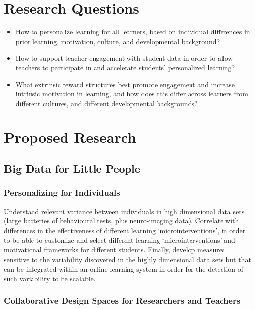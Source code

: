 \documentclass[12pt,a4paper,titlepage]{scrreprt}
\begin{document}
\chapter{Research Questions}
\begin{itemize}
\item How to personalize learning for all learners, based on individual differences in prior learning, motivation, culture, and developmental background?
\item How to support teacher engagement with student data in order to allow teachers to participate in and accelerate students' personalized learning?
\item What extrinsic reward structures best promote engagement and increase intrinsic motivation in learning, and how does this differ across learners from different cultures, and different developmental backgrounds?
\end{itemize}
\chapter{Proposed Research}
\section{Big Data for Little People}
\subsection{Personalizing for Individuals}

Understand relevant variance between individuals in high dimensional data sets (large batteries of behavioural tests, plus neuro-imaging data). Correlate with differences in the effectiveness of different learning `microinterventions', in order to be able to customize and select different learning `microinterventions' and motivational frameworks for different students. Finally, develop measures sensitive to the variability discovered in the highly dimensional data sets but that can be integrated within an online learning system in order for the detection of such variability to be scalable.

\subsection{Collaborative Design Spaces for Researchers and Teachers}
\end{document}

